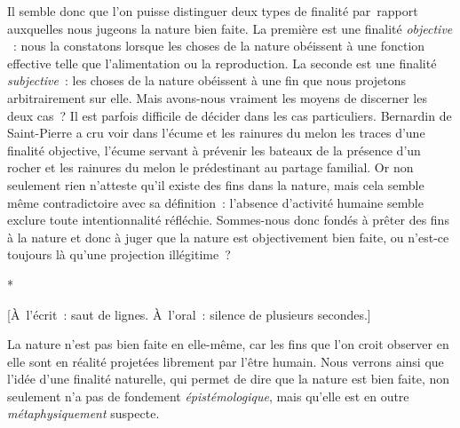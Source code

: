 \documentclass[a4paper,12pt]{report}
\begin{document}
Il semble donc que l'on puisse
distinguer deux types de finalité par rapport auxquelles nous jugeons la
nature bien faite. La première est une finalité \emph{objective}​ : nous la
constatons lorsque les choses de la nature obéissent à une fonction
effective telle que l'alimentation ou la reproduction. La seconde est
une finalité \emph{subjective}​ : les choses de la nature obéissent à une fin
que nous projetons arbitrairement sur elle. Mais
avons-nous vraiment les moyens de discerner les
deux cas ? Il est parfois difficile de décider dans les cas
particuliers. Bernardin de Saint-Pierre a cru voir dans l'écume et les
rainures du melon les traces d'une finalité objective, l'écume servant à
prévenir les bateaux de la présence d'un rocher et les rainures du melon
le prédestinant au partage familial. Or non seulement rien n'atteste
qu'il existe des fins dans la nature, mais cela semble même
contradictoire avec sa définition : l'absence d'activité humaine semble
exclure toute intentionnalité réfléchie. Sommes-nous donc fondés à
prêter des fins à la nature et donc à juger que la nature est
objectivement bien faite, ou n'est-ce toujours là qu'une projection
illégitime ?

\begin{center}
*

[À l'écrit : saut de lignes. À l'oral : silence de plusieurs secondes.]
\end{center}

La nature n'est pas bien faite en elle-même,
car les fins que l'on croit observer en elle sont en réalité projetées
librement par l'être humain. Nous verrons ainsi que l'idée d'une
finalité naturelle, qui permet de dire que la nature est bien faite, non
seulement n'a pas de fondement \emph{épistémologique}​, mais qu'elle est en
outre \emph{métaphysiquement}​ suspecte.
\end{document}
